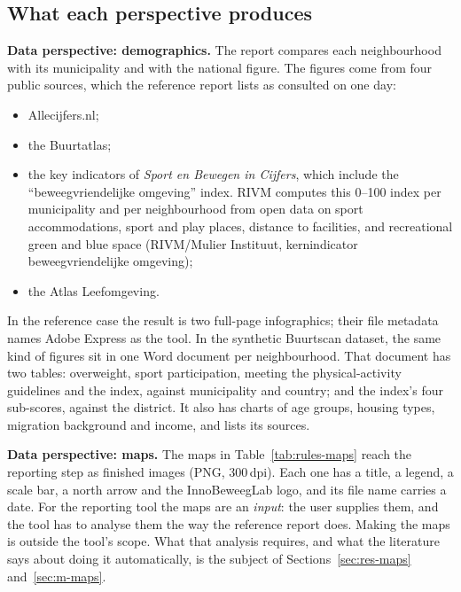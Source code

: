 \subsection{What each perspective produces}\label{sec:process-perspectives}

\textbf{Data perspective: demographics.} The report compares each neighbourhood with its municipality and with the national figure. The figures come from four public sources, which the reference report lists as consulted on one day:
\begin{itemize}
\item Allecijfers.nl;
\item the Buurtatlas;
\item the key indicators of \textit{Sport en Bewegen in Cijfers}, which include the \textquotedblleft{}beweegvriendelijke omgeving\textquotedblright{} index. RIVM computes this 0--100 index per municipality and per neighbourhood from open data on sport accommodations, sport and play places, distance to facilities, and recreational green and blue space (RIVM/Mulier Instituut, kernindicator beweegvriendelijke omgeving);
\item the Atlas Leefomgeving.
\end{itemize}
In the reference case the result is two full-page infographics; their file metadata names Adobe Express as the tool. In the synthetic Buurtscan dataset, the same kind of figures sit in one Word document per neighbourhood. That document has two tables: overweight, sport participation, meeting the physical-activity guidelines and the index, against municipality and country; and the index's four sub-scores, against the district. It also has charts of age groups, housing types, migration background and income, and lists its sources.

\textbf{Data perspective: maps.} The maps in Table~\ref{tab:rules-maps} reach the reporting step as finished images (PNG, 300\,dpi). Each one has a title, a legend, a scale bar, a north arrow and the InnoBeweegLab logo, and its file name carries a date. For the reporting tool the maps are an \textit{input}: the user supplies them, and the tool has to analyse them the way the reference report does. Making the maps is outside the tool's scope. What that analysis requires, and what the literature says about doing it automatically, is the subject of Sections~\ref{sec:res-maps} and~\ref{sec:m-maps}.

